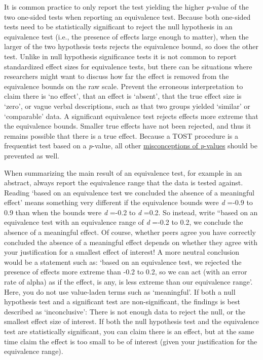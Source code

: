 \documentclass[
  oneside]{book}
\begin{document}
It is common practice to only report the test yielding the higher \emph{p}-value of the two one-sided tests when reporting an equivalence test. Because both one-sided tests need to be statistically significant to reject the null hypothesis in an equivalence test (i.e., the presence of effects large enough to matter), when the larger of the two hypothesis tests rejects the equivalence bound, so does the other test. Unlike in null hypothesis significance tests it is not common to report standardized effect sizes for equivalence tests, but there can be situations where researchers might want to discuss how far the effect is removed from the equivalence bounds on the raw scale. Prevent the erroneous interpretation to claim there is `no effect', that an effect is `absent', that the true effect size is `zero', or vague verbal descriptions, such as that two groups yielded `similar' or `comparable' data. A significant equivalence test rejects effects more extreme that the equivalence bounds. Smaller true effects have not been rejected, and thus it remains possible that there is a true effect. Because a TOST procedure is a frequentist test based on a \emph{p}-value, all other \protect\hyperlink{misconceptions}{misconceptions of \emph{p}-values} should be prevented as well.

When summarizing the main result of an equivalence test, for example in an abstract, always report the equivalence range that the data is tested against. Reading `based on an equivalence test we concluded the absence of a meaningful effect' means something very different if the equivalence bounds were \emph{d} =-0.9 to 0.9 than when the bounds were \emph{d} =-0.2 to \emph{d} =0.2. So instead, write ``based on an equivalence test with an equivalence range of \emph{d} =-0.2 to 0.2, we conclude the absence of a meaningful effect. Of course, whether peers agree you have correctly concluded the absence of a meaningful effect depends on whether they agree with your justification for a smallest effect of interest! A more neutral conclusion would be a statement such as: `based on an equivalence test, we rejected the presence of effects more extreme than -0.2 to 0.2, so we can act (with an error rate of alpha) as if the effect, is any, is less extreme than our equivalence range'. Here, you do not use value-laden terms such as `meaningful'. If both a null hypothesis test and a significant test are non-significant, the findings is best described as `inconclusive': There is not enough data to reject the null, or the smallest effect size of interest. If both the null hypothesis test and the equivalence test are statistically significant, you can claim there is an effect, but at the same time claim the effect is too small to be of interest (given your justification for the equivalence range).
\end{document}
